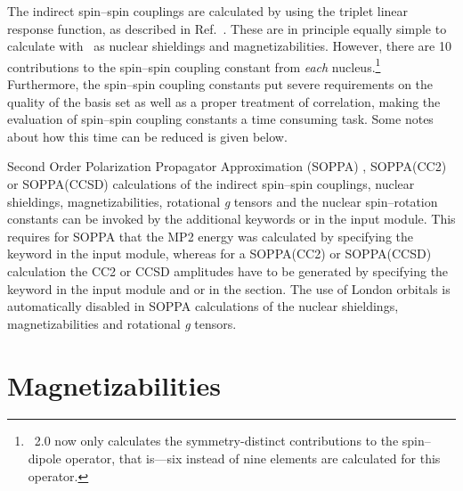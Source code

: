 The indirect spin--spin couplings are calculated by using the triplet linear
response function, as described in
Ref.~\cite{ovhapjhjajsbpthjcp96}.
These are in principle equally simple to calculate with \dalton\ as
nuclear shieldings and magnetizabilities. However, there are 10
contributions to the spin--spin coupling constant from {\em each}
nucleus.\footnote{\dalton\ 2.0 now only calculates the symmetry-distinct
  contributions to the spin--dipole operator, that is---six instead of
  nine elements are calculated for this operator.} Furthermore, the
spin--spin coupling constants put severe
requirements on the quality of the basis set as well as a proper
treatment of correlation, making the evaluation of spin--spin coupling
constants a time consuming task. Some notes about how this time
can be reduced is given below.

Second Order Polarization Propagator Approximation (SOPPA) 
\cite{esnpjjodjcp73,jopjdycpr2,mjpekdtehjajjojcp,spascpl260,tejospastcan100},
SOPPA(CC2)  \cite{spas097} or SOPPA(CCSD)
 \cite{soppaccsd,spascpl260,tejospastcan100}
calculations of the indirect spin--spin couplings, nuclear shieldings,
magnetizabilities, rotational {\em g} tensors and the nuclear
spin--rotation constants can be invoked by the additional keywords
 or  in the  input module.
This requires for SOPPA that the MP2 energy was calculated by
specifying the keyword  in the  input
module, whereas for a SOPPA(CC2) or SOPPA(CCSD) calculation the CC2 or
CCSD amplitudes have to be generated by specifying the keyword 
in the  input module and  or
 in the  section. The use of London
orbitals is automatically disabled in SOPPA calculations of the nuclear
shieldings, magnetizabilities and rotational {\em g} tensors.

\section{Magnetizabilities}\label{sec:magnetizability}

